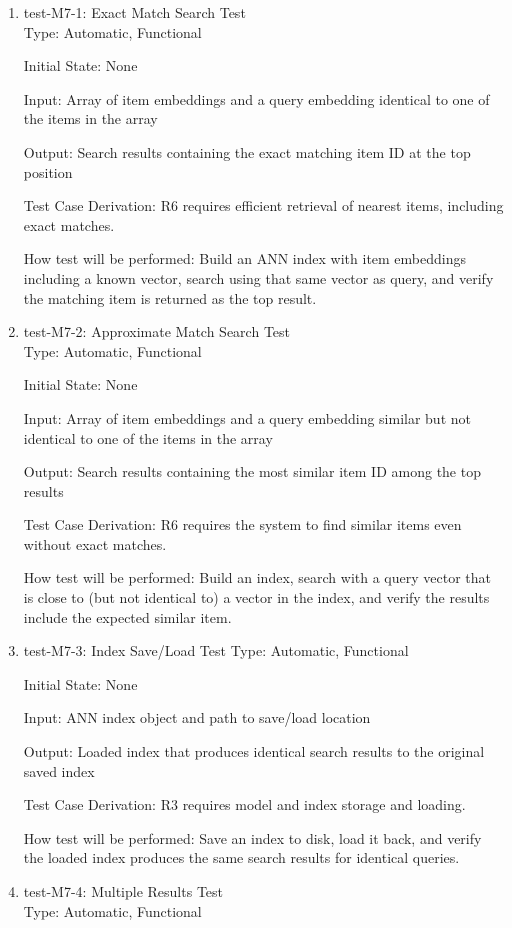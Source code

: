 \documentclass[12pt, titlepage]{article}
\begin{document}
\begin{enumerate}

  \item{test-M7-1: Exact Match Search Test\\}
  Type: Automatic, Functional
            
  Initial State: None
            
  Input: Array of item embeddings and a query embedding identical to one of the items in the array
            
  Output: Search results containing the exact matching item ID at the top position
  
  Test Case Derivation: R6 requires efficient retrieval of nearest items, including exact matches.
  
  How test will be performed: Build an ANN index with item embeddings including a known vector, search using that same vector as query, and verify the matching item is returned as the top result.
  
  \item{test-M7-2: Approximate Match Search Test\\}
  Type: Automatic, Functional
  
  Initial State: None
  
  Input: Array of item embeddings and a query embedding similar but not identical to one of the items in the array
  
  Output: Search results containing the most similar item ID among the top results
  
  Test Case Derivation: R6 requires the system to find similar items even without exact matches.
  
  How test will be performed: Build an index, search with a query vector that is close to (but not identical to) a vector in the index, and verify the results include the expected similar item.
  
  \item{test-M7-3: Index Save/Load Test}
  Type: Automatic, Functional
  
  Initial State: None
  
  Input: ANN index object and path to save/load location
  
  Output: Loaded index that produces identical search results to the original saved index
  
  Test Case Derivation: R3 requires model and index storage and loading.
  
  How test will be performed: Save an index to disk, load it back, and verify the loaded index produces the same search results for identical queries.
  \item{test-M7-4: Multiple Results Test\\}
  Type: Automatic, Functional
  

\end{enumerate}
\end{document}
